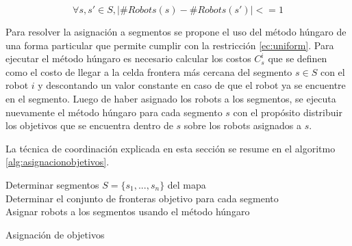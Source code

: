 \begin{equation}\label{ec:uniform}
  \forall s,s' \in S, |\#Robots(s) - \#Robots(s')| <= 1
\end{equation}

Para resolver la asignación a segmentos se propone el uso del método húngaro
\cite{kuhn1955hungarian} de una forma particular que permite cumplir con la
restricción \eqref{ec:uniform}. Para ejecutar el método húngaro es necesario
calcular los costos $C_{s}^{i}$ que se definen como el costo de llegar a la
celda frontera más cercana del segmento $s \in S$ con el robot $i$ y
descontando un valor constante en caso de que el robot ya se encuentre en el
segmento. Luego de haber asignado los robots a los segmentos, se ejecuta
nuevamente el método húngaro para cada segmento $s$ con el propósito distribuir
los objetivos que se encuentra dentro de $s$ sobre los robots asignados a $s$.

La técnica de coordinación explicada en esta sección se resume en el algoritmo \ref{alg:asignacionobjetivos}.

\begin{algorithm}[H]
\SetAlgoLined
    Determinar segmentos $S = \{s_{1} , ..., s_{n} \}$ del mapa\\
    Determinar el conjunto de fronteras objetivo para cada segmento\\
    Asignar robots a los segmentos usando el método húngaro\\
    \caption{Asignación de objetivos}
    \label{alg:asignacionobjetivos}
\end{algorithm}

